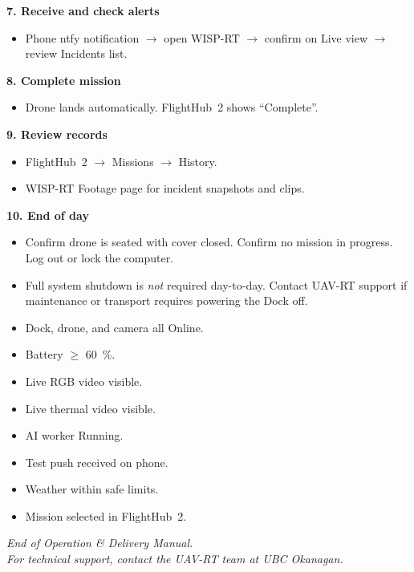\documentclass[11pt,letterpaper]{article}
\newcommand{\chk}{\item[$\Box$]}
\begin{document}
\begin{tcolorbox}[colback=uavlight, colframe=uavblue, boxrule=0.8pt, arc=3pt,
  title={\bfseries Daily WISP-RT Operating Workflow}, coltitle=white,
  colbacktitle=uavblue, fonttitle=\Large]
\textbf{7. Receive and check alerts}
\begin{itemize}[leftmargin=1.5em, itemsep=0.1em]
  \item Phone ntfy notification $\rightarrow$ open WISP-RT $\rightarrow$ confirm on Live view $\rightarrow$ review Incidents list.
\end{itemize}

\textbf{8. Complete mission}
\begin{itemize}[leftmargin=1.5em, itemsep=0.1em]
  \item Drone lands automatically. FlightHub~2 shows ``Complete''.
\end{itemize}

\textbf{9. Review records}
\begin{itemize}[leftmargin=1.5em, itemsep=0.1em]
  \item FlightHub~2 $\rightarrow$ Missions $\rightarrow$ History.
  \item WISP-RT Footage page for incident snapshots and clips.
\end{itemize}

\textbf{10. End of day}
\begin{itemize}[leftmargin=1.5em, itemsep=0.1em]
  \item Confirm drone is seated with cover closed. Confirm no mission in progress. Log out or lock the computer.
  \item Full system shutdown is \emph{not} required day-to-day. Contact UAV-RT support if maintenance or transport requires powering the Dock off.
\end{itemize}

\end{tcolorbox}

\vspace{0.6cm}

\begin{tcolorbox}[colback=uavlight, colframe=uavwarn, boxrule=0.6pt,
  title={\bfseries Pre-Mission Checklist}, coltitle=white,
  colbacktitle=uavwarn]
\begin{itemize}[leftmargin=1.5em, itemsep=0.1em]
  \chk Dock, drone, and camera all Online.
  \chk Battery $\geq$ 60~\%.
  \chk Live RGB video visible.
  \chk Live thermal video visible.
  \chk AI worker Running.
  \chk Test push received on phone.
  \chk Weather within safe limits.
  \chk Mission selected in FlightHub~2.
\end{itemize}
\end{tcolorbox}

\vspace{0.6cm}

\begin{center}
\small\color{uavgrey}\itshape
End of Operation \& Delivery Manual. \\
For technical support, contact the UAV-RT team at UBC Okanagan.
\end{center}
\end{document}
